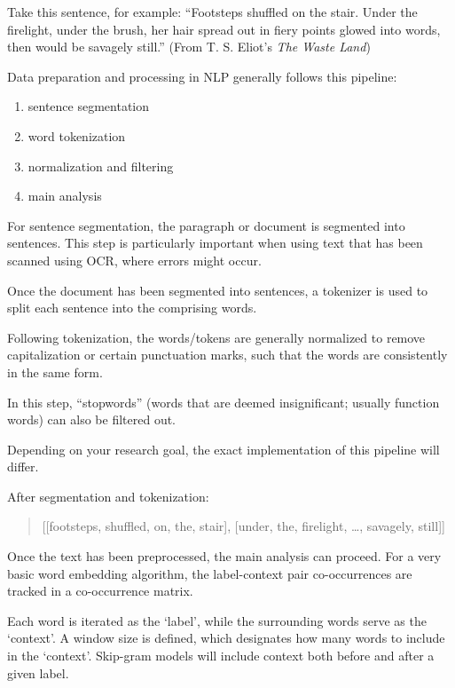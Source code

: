 Take this sentence, for example: ``Footsteps shuffled on the stair. Under the firelight, under the brush, her hair spread out in fiery points glowed into words, then would be savagely still.'' (From T. S. Eliot's \textit{The Waste Land})

Data preparation and processing in NLP generally follows this pipeline: 

\begin{enumerate}
\item sentence segmentation
\item word tokenization
\item normalization and filtering
\item main analysis
\end{enumerate}

For sentence segmentation, the paragraph or document is segmented into sentences. This step is particularly important when using text that has been scanned using OCR, where errors might occur.

Once the document has been segmented into sentences, a tokenizer is used to split each sentence into the comprising words. 

Following tokenization, the words/tokens are generally normalized to remove capitalization or certain punctuation marks, such that the words are consistently in the same form.

In this step, ``stopwords'' (words that are deemed insignificant; usually function words) can also be filtered out.

Depending on your research goal, the exact implementation of this pipeline will differ.


After segmentation and tokenization: 
\begin{quote}
[[footsteps, shuffled, on, the, stair], 
[under, the, firelight, \dots, savagely, still]]
\end{quote}

Once the text has been preprocessed, the main analysis can proceed. For a very basic word embedding algorithm, the label-context pair co-occurrences are tracked in a co-occurrence matrix.

Each word is iterated as the `label', while the surrounding words serve as the `context'. A window size is defined, which designates how many words to include in the `context'. Skip-gram models will include context both before and after a given label.


